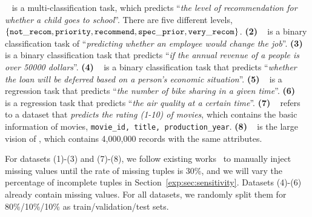 ~\cite{nursery} is a multi-classification task, which  predicts ``{\it the level of recommendation for whether a child goes to school}''. There are five different levels, \ie $\{ {\tt not\_recom, priority, recommend, spec\_prior, very\_recom} \}$. %
{\bf (2) \hr}~\cite{chai2022selective} is a binary classification task of ``{\it predicting whether an employee would change the job}''.  %
{\bf (3) \adult}~\cite{adult} is a binary classification task that predicts ``{\it if the annual revenue of a people is over 50000 dollars}''. %
{\bf (4) \credit}~\cite{kaggle} is a binary classification task that predicts ``{\it whether the loan will be deferred based on a person's economic situation}''.  %
{\bf (5) \bike}~\cite{bike} is a regression task that predicts ``{\it the number of bike sharing in a given time}''. %
{\bf (6) \air}~\cite{auctus} is a regression task that predicts ``{\it the air quality at a certain time}''. %
{\bf (7) \imdb}~\cite{DBLP:journals/pvldb/LeisGMBK015} refers to a dataset that \textit{predicts the rating (1-10) of movies}, which contains the basic information of movies, \eg \texttt{movie\_id, title, production\_year}.
%
{\bf (8) \imdbl}~\cite{DBLP:journals/pvldb/LeisGMBK015} is the large vision of \imdb, which contains 4,000,000 records with the same attributes.


For datasets (1)-(3) and (7)-(8), we follow existing works~\cite{DBLP:journals/jbd/KhanH20,DBLP:conf/icml/YoonJS18,DBLP:conf/mlsys/WuZIR20} to manually inject missing values until the  rate of missing tuples is 30\%, and we will vary the percentage of incomplete tuples in Section~\ref{exp:sec:sensitivity}. Datasets (4)-(6) already contain missing values. For all datasets, we randomly split them for 80\%/10\%/10\% as train/validation/test sets.






